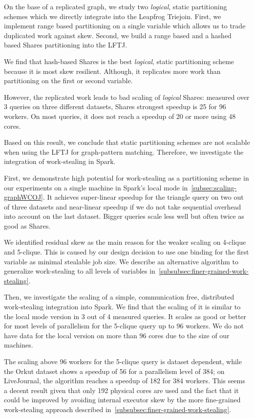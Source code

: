 On the base of a replicated graph, we study two \textit{logical}, static partitioning schemes which we directly integrate into the
Leapfrog Triejoin.
First, we implement range based partitioning on a single variable which allows us to trade duplicated work against skew.
Second, we build a range based and a hashed based Shares partitioning into the \textsc{LFTJ}.

We find that hash-based Shares is the best \textit{logical}, static partitioning scheme because it is most skew resilient.
Although, it replicates more work than partitioning on the first or second variable.

However, the replicated work leads to bad scaling of \textit{logical} Shares:
measured over 3 queries on three different datasets, Shares strongest speedup is 25 for 96 workers.
On most queries, it does not reach a speedup of 20 or more using 48 cores.

Based on this result, we conclude that static partitioning schemes are not scalable when using the \textsc{LFTJ} for graph-pattern
matching.
Therefore, we investigate the integration of work-stealing in Spark.

First, we demonstrate high potential for work-stealing as a partitioning scheme in our experiments on a single machine in Spark's local
mode in~\cref{subsec:scaling-graphWCOJ}.
It achieves super-linear speedup for the triangle query on two out of three datasets and near-linear speedup if we do not take sequential
overhead into account on the last dataset.
Bigger queries scale less well but often twice as good as Shares.

We identified residual skew as the main reason for the weaker scaling on 4-clique and 5-clique.
This is caused by our design decision to use one binding for the first variable as minimal stealable job size.
We describe an alternative algorithm to generalize work-stealing to all levels of variables in~\cref{subsubsec:finer-grained-work-stealing}.

Then, we investigate the scaling of a simple, communication free, distributed work-stealing integration into Spark.
We find that the scaling of it is similar to the local mode version in 3 out of 4 measured queries.
It scales as good or better for most levels of parallelism for the 5-clique query up to 96 workers.
We do not have data for the local version on more than 96 cores due to the size of our machines.

The scaling above 96 workers for the 5-clique query is dataset dependent, while
the Orkut dataset shows a speedup of 56 for a parallelism level of 384;
on LiveJournal, the algorithm reaches a speedup of 182 for 384 workers.
This seems a decent result given that only 192 physical cores are used and the fact that
it could be improved by avoiding internal executor skew by the more fine-grained work-stealing
approach described in~\cref{subsubsec:finer-grained-work-stealing}.

